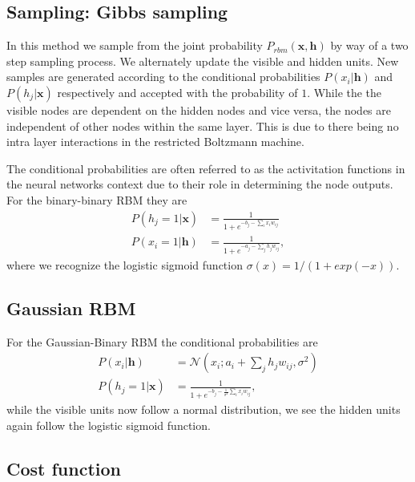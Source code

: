 \documentclass[%
oneside,                 %
final,                   %
10pt]{article}
\begin{document}
\subsection{Sampling: Gibbs sampling}

In this method we sample from the joint probability $P_{rbm} (\mathbf{x}, \mathbf{h})$ by way of a two step sampling process. We alternately update the visible and hidden units.
New samples are generated according to the conditional probabilities $P(x_i|\mathbf{h})$ and $P(h_j|\mathbf{x})$ respectively and accepted with the probability of $1$. While the the visible nodes are dependent on the hidden nodes and vice versa, the nodes are independent of other nodes within the same layer. This is due to there being no intra layer interactions in the restricted Boltzmann machine.

The conditional probabilities are often referred to as the activitation functions in the neural networks context due to their role in determining the node outputs. For the binary-binary RBM they are
\begin{align}
	P(h_j = 1 | \bm{x}) &= \frac{1}{1 + e^{-b_j - \sum_i x_i w_{ij}}} \\
	P(x_i = 1 | \bm{h}) &= \frac{1}{1 + e^{-a_j - \sum_j h_j w_{ij}}},
\end{align}
where we recognize the logistic sigmoid function $\sigma (x) = 1/(1+exp(-x))$.

\subsection{Gaussian RBM}
For the Gaussian-Binary RBM the conditional probabilities are
\begin{align}
	P(x_i|\mathbf{h}) &= \mathcal{N}(x_i; a_i+ \sum_j h_j w_{ij}, \sigma^2) \\
	P(h_j=1|\mathbf{x}) &=  \frac{1}{1+e^{-b_j-\frac{1}{\sigma^2} \sum_i x_i w_{ij}}},
\end{align}
while the visible units now follow a normal distribution, we see the hidden units again follow the logistic sigmoid function.

\subsection{Cost function}
\end{document}
